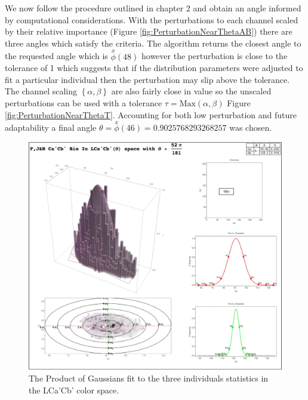 We now follow the procedure outlined in chapter 2 and obtain an angle informed by computational considerations.  
With the perturbations to each channel scaled by their relative importance (Figure \ref{fig:PerturbationNearThetaAB}) there are three angles which satisfy the criteria.
 The algorithm returns the closest angle to the requested angle which is $\overset{x}{\phi } (48)$ however the perturbation is close to the tolerance of 1 which suggests that if the distribution parameters were adjusted to fit a particular individual then the perturbation may slip above the tolerance. 
 The channel scaling $\left\{ \alpha, \beta\right\} $ are also fairly close in value so the unscaled perturbations can be used with a tolerance $\tau = \text{Max}\left(\alpha, \beta\right)$ Figure \ref{fig:PerturbationNearThetaT}. 
 Accounting for both low perturbation and future adaptability a final angle $\theta = \overset{x}{\phi }(46) = 0.9025768293268257$ was chosen.

\begin{figure}[h!]
  \centering
  \includegraphics[width=1.0 \textwidth]{Chapter3/Figs/Fit_the_Gaussian_Final.jpg} 
    \caption{The Product of Gaussians fit to the three individuals statistics in the LCa'Cb' color space.  }  \label{fig:FittheGaussianFinal}
\end{figure}

